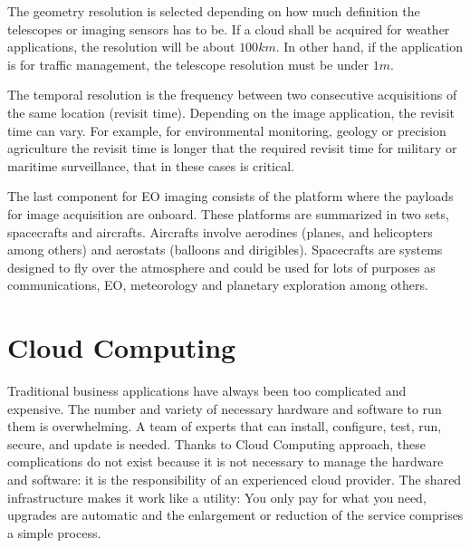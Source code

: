 
The geometry resolution is selected depending on how much definition the
telescopes or imaging sensors has to be. If a cloud shall be acquired for
weather applications, the resolution will be about $100km$. In
other hand, if the application is for traffic management, the telescope
resolution must be under $1m$.

The temporal resolution is the frequency between two consecutive
acquisitions of the same location (revisit time). Depending on the image
application, the revisit time can vary. For example, for environmental
monitoring, geology or precision agriculture the revisit time is longer that the
required revisit time for military or maritime surveillance, that
in these cases is critical.

The last component for \ac{EO} imaging consists of the platform where the
payloads for image acquisition are onboard. These platforms are summarized in two sets, spacecrafts and
aircrafts. Aircrafts involve aerodines (planes, and helicopters among
others) and aerostats (balloons and dirigibles). Spacecrafts are systems designed
to fly over the atmosphere and could be used for lots of purposes as communications, \ac{EO},
meteorology and planetary exploration among others. 


\section{Cloud Computing}

Traditional business applications have always been too complicated and
expensive. The number and variety of necessary hardware and software to run them
is overwhelming. A team of experts that can install, configure, test, run,
secure, and update is needed. 
Thanks to Cloud Computing approach, these
complications do not exist because it is not necessary to manage the hardware
and software: it is the responsibility of an experienced cloud provider. The
shared infrastructure makes it work like a utility: You only pay for what you
need, upgrades are automatic and the enlargement or reduction of the service
comprises a simple process.

